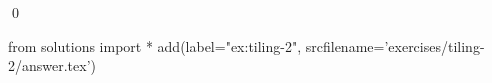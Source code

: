 \begin{ex}
  \label{ex:tiling-2}
  
  \qed
\end{ex}
\begin{python0}
from solutions import *
add(label="ex:tiling-2",
    srcfilename='exercises/tiling-2/answer.tex') 
\end{python0}                              
